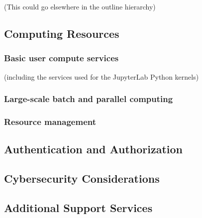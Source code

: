 (This could go elsewhere in the outline hierarchy)

\subsection{Computing Resources}\label{computing-resources}

\subsubsection{Basic user compute services}\label{basic-user-compute-services}

(including the services used for the JupyterLab Python kernels)

\subsubsection{Large-scale batch and parallel computing}\label{large-scale-batch-and-parallel-computing}

\subsubsection{Resource management}\label{resource-management}

\subsection{Authentication and Authorization}\label{authentication-and-authorization}

\subsection{Cybersecurity Considerations}\label{cybersecurity-considerations}

\subsection{Additional Support Services}\label{additional-support-services}

